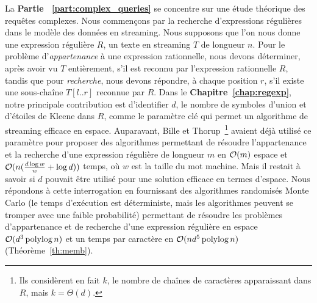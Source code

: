 La \textbf{Partie ~\ref{part:complex_queries}} se concentre sur une étude théorique des requêtes complexes.
Nous commençons par la recherche d'expressions régulières dans le modèle des données en streaming.
%
Nous supposons que l'on nous donne une expression régulière $R$, un texte en streaming $T$ de longueur $n$. Pour le problème d'\emph{appartenance} à une expression rationnelle, nous devons déterminer, après avoir vu $T$ entièrement, s'il est reconnu par l'expression rationnelle $R$, tandis que pour \emph{recherche}, nous devons répondre, à chaque position $r$, s'il existe une sous-chaîne $T[l..r]$ reconnue par $R$.
Dans le \textbf{Chapitre~\ref{chap:regexp}}, notre principale contribution est d'identifier $d$, le nombre de symboles d'union et d'étoiles de Kleene dans $R$, comme le paramètre clé qui permet un algorithme de streaming efficace en espace. 
Auparavant, Bille et Thorup~\cite{doi:10.1137/1.9781611973075.104}\footnote{Ils considèrent en fait $k$, le nombre de chaînes de caractères apparaissant dans $R$, mais $k=\Theta(d)$. } avaient déjà utilisé ce paramètre pour proposer des algorithmes permettant de résoudre l'appartenance et la recherche d'une expression régulière de longueur $m$ en $\mathcal{O}(m)$ espace et $\mathcal{O}(n(\frac{d\log w}{w} + \log d))$ temps, où $w$ est la taille du mot machine. Mais il restait à savoir si $d$ pouvait être utilisé pour une solution efficace en termes d'espace.
%
Nous répondons à cette interrogation en fournissant des algorithmes randomisés Monte Carlo (le temps d'exécution est déterministe, mais les algorithmes peuvent se tromper avec une faible probabilité) permettant de résoudre les problèmes d'appartenance et de recherche d'une expression régulière en espace $\mathcal{O}(d^3\operatorname{polylog} n)$ et un temps par caractère en $\mathcal{O}(nd^5\operatorname{polylog} n)$ (Théorème~\ref{th:memb}).

